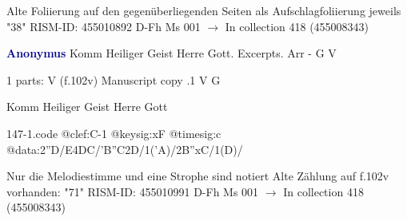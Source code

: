 \documentclass[twocolumn]{book}
\begin{document}
\newline Alte Foliierung auf den gegenüberliegenden Seiten als Aufschlagfoliierung jeweils "38"
\newline RISM-ID: 455010892
\newline D-Fh  Ms 001
\newline $\rightarrow$ In collection 418 (455008343)
      
\newline \par \vspace{7pt} \textcolor{darkblue}{\textbf{Anonymus  }}
\newline Komm Heiliger Geist Herre Gott. Excerpts. Arr - G
\newline V
\newline \begin{itshape}\end{itshape} 
\newline \textcolor{darkblue}{}  1 parts: V  (f.102v)
\newline Manuscript copy
.1  V  G
\newline \begin{footnotesize} Komm Heiliger Geist Herre Gott \end{footnotesize}  
\begin{filecontents*}{147-1.code}
@clef:C-1
@keysig:xF
@timesig:c
@data:2''D/E4DC/'B''C2D/1('A)/2B''xC/1(D)/
\end{filecontents*}
\newline
%

\newline Nur die Melodiestimme und eine Strophe sind notiert
\newline Alte Zählung auf f.102v vorhanden: "71"
\newline RISM-ID: 455010991
\newline D-Fh  Ms 001
\newline $\rightarrow$ In collection 418 (455008343)
      
\end{document}
